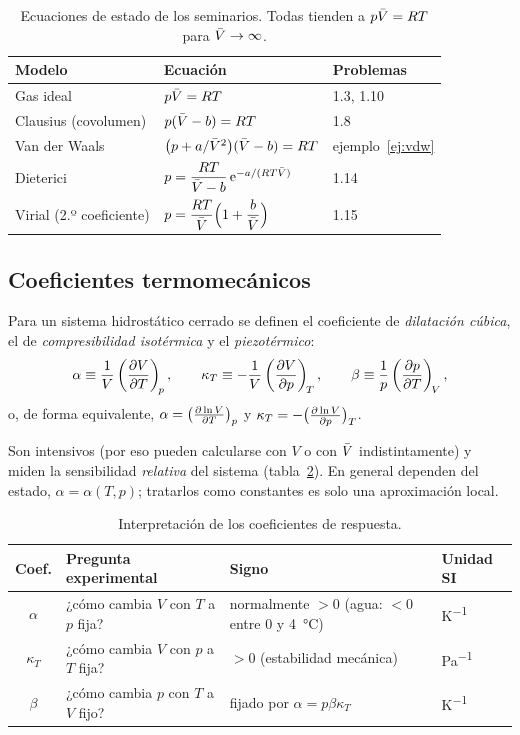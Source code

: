\begin{table}[htbp]
\centering
\caption{Ecuaciones de estado de los seminarios. Todas tienden a $p\bar{V}=RT$ para $\bar{V}\to\infty$.}
\label{tab:modelos}
\small
\renewcommand{\arraystretch}{1.75}
\begin{tabular}{lll}
\toprule
Modelo & Ecuación & Problemas\\
\midrule
Gas ideal & $p\bar{V}=RT$ & 1.3, 1.10\\
Clausius (covolumen) & $p(\bar{V}-b)=RT$ & 1.8\\
Van der Waals & $\bigl(p+a/\bar{V}^2\bigr)(\bar{V}-b)=RT$ & ejemplo~\ref{ej:vdw}\\
Dieterici & $p=\dfrac{RT}{\bar{V}-b}\,\mathrm{e}^{-a/(RT\bar{V})}$ & 1.14\\
Virial (2.º coeficiente) & $p=\dfrac{RT}{\bar{V}}\Bigl(1+\dfrac{b}{\bar{V}}\Bigr)$ & 1.15\\
\bottomrule
\end{tabular}
\end{table}

\subsection{Coeficientes termomecánicos}

\begin{definicion}
Para un sistema hidrostático cerrado se definen el coeficiente de \emph{dilatación cúbica}, el de
\emph{compresibilidad isotérmica} y el \emph{piezotérmico}:
\begin{equation}\label{eq:coef}
  \alpha\equiv\frac1V\left(\frac{\partial V}{\partial T}\right)_{\!p},\qquad
  \kappa_T\equiv-\frac1V\left(\frac{\partial V}{\partial p}\right)_{\!T},\qquad
  \beta\equiv\frac1p\left(\frac{\partial p}{\partial T}\right)_{\!V},
\end{equation}
o, de forma equivalente, $\alpha=\bigl(\tfrac{\partial \ln V}{\partial T}\bigr)_{p}$ y $\kappa_T=-\bigl(\tfrac{\partial \ln V}{\partial p}\bigr)_{T}$.
\end{definicion}

Son intensivos (por eso pueden calcularse con $V$ o con $\bar{V}$ indistintamente) y miden la sensibilidad
\emph{relativa} del sistema (tabla~\ref{tab:coef}). En general dependen del estado, $\alpha=\alpha(T,p)$;
tratarlos como constantes es solo una aproximación local.

\begin{table}[htbp]
\centering
\caption{Interpretación de los coeficientes de respuesta.}
\label{tab:coef}
\small
\begin{tabular}{clll}
\toprule
Coef. & Pregunta experimental & Signo & Unidad SI\\
\midrule
$\alpha$ & ¿cómo cambia $V$ con $T$ a $p$ fija? & normalmente $>0$ (agua: $<0$ entre 0 y \SI{4}{\celsius}) & \si{K^{-1}}\\
$\kappa_T$ & ¿cómo cambia $V$ con $p$ a $T$ fija? & $>0$ (estabilidad mecánica) & \si{Pa^{-1}}\\
$\beta$ & ¿cómo cambia $p$ con $T$ a $V$ fijo? & fijado por $\alpha=p\beta\kappa_T$ & \si{K^{-1}}\\
\bottomrule
\end{tabular}
\end{table}


